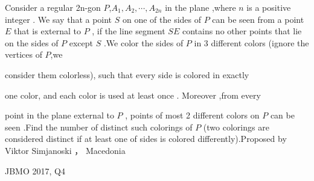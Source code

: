 Consider a regular 2n-gon $ P$,$A_1,A_2,\cdots ,A_{2n}$ in the plane ,where $n$ is a positive integer . We say that a point $S$ on one of the sides of  $P$ can be seen from a point $E$ that is external to $P$ , if the line segment $SE$ contains no other points that lie  on the sides of $P$ except  $S$ .We color the sides of $P$ in 3 different colors (ignore the vertices of $P$,we

 consider them colorless), such that every side is colored in exactly 

one color, and each color is used at least once . Moreover  ,from every 

point in the plane external to $P$ , points of most 2  different colors on $P$ can be seen .Find the number of distinct such colorings of $P$ (two colorings are considered distinct if at least one of sides is colored differently).Proposed by  Viktor Simjanoski ， Macedonia

JBMO 2017, Q4